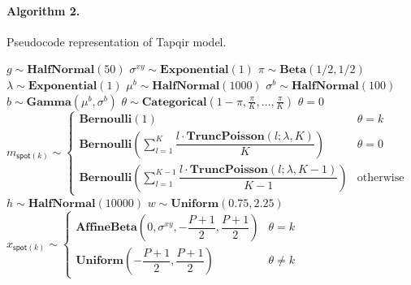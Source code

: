 \paragraph{Algorithm 2.} Pseudocode representation of Tapqir model. \\

\begin{algorithmic}[1]
\State $g \sim \mathbf{HalfNormal}(50)$
\State $\sigma^{xy} \sim \mathbf{Exponential}(1)$
\State $\pi \sim \mathbf{Beta}(1/2, 1/2)$
\State $\lambda \sim \mathbf{Exponential}(1)$
    \State $\mu^b \sim \mathbf{HalfNormal}(1000)$
    \State $\sigma^b \sim \mathbf{HalfNormal}(100)$
        \State $b \sim \mathbf{Gamma}(\mu^b, \sigma^b)$
            \State $\theta \sim \mathbf{Categorical}\left(1 - \pi, \frac{\pi}{K}, \dots, \frac{\pi}{K}\right)$
            \State $\theta = 0$
        \EndIf
            \State $ m_{\mathsf{spot}(k)} \sim
                \begin{cases}
                    \mathbf{Bernoulli}(1) & \text{$\theta = k$} \\
                    \mathbf{Bernoulli} \left( \sum_{l=1}^K \dfrac{l \cdot \mathbf{TruncPoisson}(l; \lambda, K)}{K} \right) & \text{$\theta = 0$} \\
                    \mathbf{Bernoulli} \left( \sum_{l=1}^{K-1} \dfrac{l \cdot \mathbf{TruncPoisson}(l; \lambda, K-1)}{K-1} \right) & \text{otherwise}
                \end{cases} $
            \State $h \sim \mathbf{HalfNormal}(10000)$
            \State $w \sim \mathbf{Uniform}(0.75, 2.25)$
            \State $ x_{\mathsf{spot}(k)} \sim
                \begin{cases}
                \mathbf{AffineBeta}\left( 0, \sigma^{xy}, -\dfrac{P+1}{2}, \dfrac{P+1}{2} \right) & \theta = k \\
                \mathbf{Uniform}\left(-\dfrac{P+1}{2}, \dfrac{P+1}{2} \right) & \theta \neq k \end{cases} $

\end{algorithmic}
